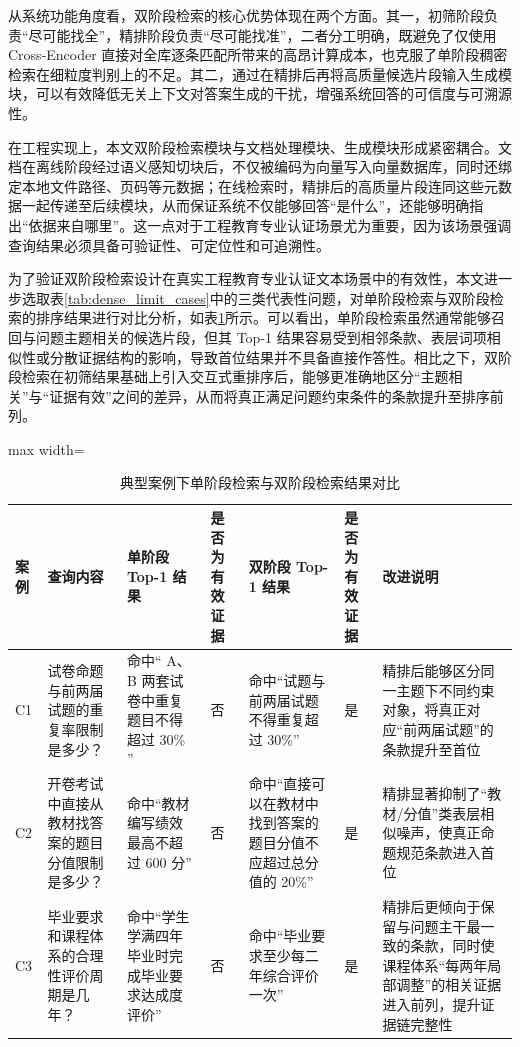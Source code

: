 \documentclass[UTF8,a4paper,zihao=-4]{ctexart}
\begin{document}
从系统功能角度看，双阶段检索的核心优势体现在两个方面。其一，初筛阶段负责“尽可能找全”，精排阶段负责“尽可能找准”，二者分工明确，既避免了仅使用 Cross-Encoder 直接对全库逐条匹配所带来的高昂计算成本，也克服了单阶段稠密检索在细粒度判别上的不足。其二，通过在精排后再将高质量候选片段输入生成模块，可以有效降低无关上下文对答案生成的干扰，增强系统回答的可信度与可溯源性。

在工程实现上，本文双阶段检索模块与文档处理模块、生成模块形成紧密耦合。文档在离线阶段经过语义感知切块后，不仅被编码为向量写入向量数据库，同时还绑定本地文件路径、页码等元数据；在线检索时，精排后的高质量片段连同这些元数据一起传递至后续模块，从而保证系统不仅能够回答“是什么”，还能够明确指出“依据来自哪里”。这一点对于工程教育专业认证场景尤为重要，因为该场景强调查询结果必须具备可验证性、可定位性和可追溯性。

为了验证双阶段检索设计在真实工程教育专业认证文本场景中的有效性，本文进一步选取表\ref{tab:dense_limit_cases}中的三类代表性问题，对单阶段检索与双阶段检索的排序结果进行对比分析，如表\ref{tab:retrieval_case_compare}所示。可以看出，单阶段检索虽然通常能够召回与问题主题相关的候选片段，但其 Top-1 结果容易受到相邻条款、表层词项相似性或分散证据结构的影响，导致首位结果并不具备直接作答性。相比之下，双阶段检索在初筛结果基础上引入交互式重排序后，能够更准确地区分“主题相关”与“证据有效”之间的差异，从而将真正满足问题约束条件的条款提升至排序前列。

\begin{table}[H]
\centering
\caption{典型案例下单阶段检索与双阶段检索结果对比}
\label{tab:retrieval_case_compare}
{\small
\renewcommand{\arraystretch}{1.2}
\begin{adjustbox}{max width=\textwidth}
\begin{tabular}{p{0.9cm} p{3.8cm} p{3.7cm} p{1.7cm} p{3.8cm} p{1.7cm} p{3.9cm}}
\toprule
案例 & 查询内容 & 单阶段 Top-1 结果 & 是否为有效证据 & 双阶段 Top-1 结果 & 是否为有效证据 & 改进说明 \\
\midrule
C1
& 试卷命题与前两届试题的重复率限制是多少？
& 命中“ A、B 两套试卷中重复题目不得超过 30\% ”
& 否
& 命中“试题与前两届试题不得重复超过 30\%”
& 是
& 精排后能够区分同一主题下不同约束对象，将真正对应“前两届试题”的条款提升至首位 \\

C2
& 开卷考试中直接从教材找答案的题目分值限制是多少？
& 命中“教材编写绩效最高不超过 600 分”
& 否
& 命中“直接可以在教材中找到答案的题目分值不应超过总分值的 20\%”
& 是
& 精排显著抑制了“教材/分值”类表层相似噪声，使真正命题规范条款进入首位 \\

C3
& 毕业要求和课程体系的合理性评价周期是几年？
& 命中“学生学满四年毕业时完成毕业要求达成度评价”
& 否
& 命中“毕业要求至少每二年综合评价一次”
& 是
& 精排后更倾向于保留与问题主干最一致的条款，同时使课程体系“每两年局部调整”的相关证据进入前列，提升证据链完整性 \\
\bottomrule
\end{tabular}
\end{adjustbox}
}
\end{table}
\end{document}
